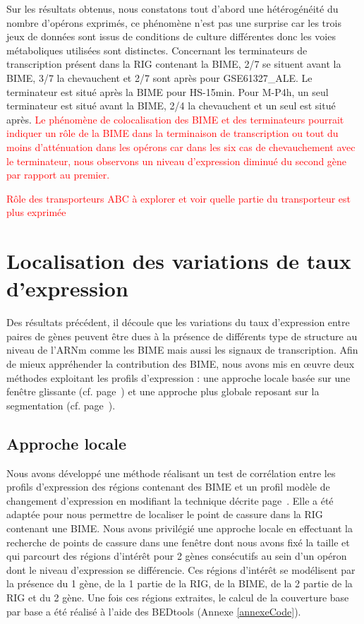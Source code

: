 \documentclass[12pt,a4paper]{report}
\begin{document}
\begin{onehalfspace}
Sur les résultats obtenus, nous constatons tout d'abord une hétérogénéité du nombre d'opérons exprimés, ce phénomène n'est pas une surprise car les trois jeux de données sont issus de conditions de culture différentes donc les voies métaboliques utilisées sont distinctes. Concernant les terminateurs de transcription présent dans la RIG contenant la BIME, 2/7 se situent avant la BIME, 3/7 la chevauchent et 2/7 sont après pour GSE61327\_ALE. Le terminateur est situé après la BIME pour HS-15min. Pour M-P4h, un seul terminateur est situé avant la BIME, 2/4 la chevauchent et un seul est situé après. \textcolor{red}{Le phénomène de colocalisation des BIME et des terminateurs pourrait indiquer un rôle de la BIME dans la terminaison de transcription ou tout du moins d'atténuation dans les opérons car dans les six cas de chevauchement avec le terminateur, nous observons un niveau d'expression diminué du second gène par rapport au premier.}

\textcolor{red}{Rôle des transporteurs ABC à explorer et voir quelle partie du transporteur est plus exprimée}

\section*{Localisation des variations de taux d'expression}

Des résultats précédent, il découle que les variations du taux d’expression entre paires de gènes peuvent être dues à la présence de différents type de structure au niveau de l’ARNm comme les BIME mais aussi les signaux de transcription. Afin de mieux appréhender la contribution des BIME, nous avons mis en œuvre deux méthodes exploitant les profils d’expression : une approche locale basée sur une fenêtre glissante (cf. page~\pageref{methode_correlation}) et une approche plus globale reposant sur la segmentation (cf. page~\pageref{methode_segmentation}). 

\subsection*{Approche locale}
\label{approche_locale}
Nous avons développé une méthode réalisant un test de corrélation entre les profils d'expression des régions contenant des BIME et un profil modèle de changement d'expression en modifiant la technique décrite page~\pageref{methode_correlation}. Elle a été adaptée pour nous permettre de localiser le point de cassure dans la RIG contenant une BIME. Nous avons privilégié une approche locale en effectuant la recherche de points de cassure dans une fenêtre dont nous avons fixé la taille et qui parcourt des régions d'intérêt pour 2 gènes consécutifs au sein d'un opéron dont le niveau d'expression se différencie. Ces régions d'intérêt se modélisent par la présence du 1 gène, de la 1 partie de la RIG, de la BIME, de la 2 partie de la RIG et du 2 gène. Une fois ces régions extraites, le calcul de la couverture base par base a été réalisé à l'aide des BEDtools (Annexe \ref{annexeCode}).


\end{onehalfspace}
\end{document}
